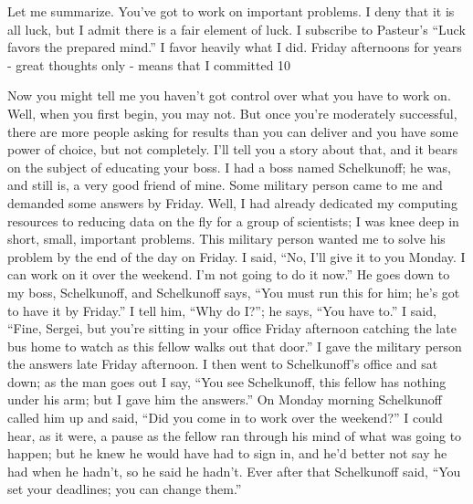 \documentclass{article}
\begin{document}
Let me summarize. You've got to work on important problems. I deny that it is all luck, but I admit there is a fair element of luck. I subscribe to Pasteur's ``Luck favors the prepared mind.'' I favor heavily what I did. Friday afternoons for years - great thoughts only - means that I committed 10%

Now you might tell me you haven't got control over what you have to work on. Well, when you first begin, you may not. But once you're moderately successful, there are more people asking for results than you can deliver and you have some power of choice, but not completely. I'll tell you a story about that, and it bears on the subject of educating your boss. I had a boss named Schelkunoff; he was, and still is, a very good friend of mine. Some military person came to me and demanded some answers by Friday. Well, I had already dedicated my computing resources to reducing data on the fly for a group of scientists; I was knee deep in short, small, important problems. This military person wanted me to solve his problem by the end of the day on Friday. I said, ``No, I'll give it to you Monday. I can work on it over the weekend. I'm not going to do it now.'' He goes down to my boss, Schelkunoff, and Schelkunoff says, ``You must run this for him; he's got to have it by Friday.'' I tell him, ``Why do I?''; he says, ``You have to.'' I said, ``Fine, Sergei, but you're sitting in your office Friday afternoon catching the late bus home to watch as this fellow walks out that door.'' I gave the military person the answers late Friday afternoon. I then went to Schelkunoff's office and sat down; as the man goes out I say, ``You see Schelkunoff, this fellow has nothing under his arm; but I gave him the answers.'' On Monday morning Schelkunoff called him up and said, ``Did you come in to work over the weekend?'' I could hear, as it were, a pause as the fellow ran through his mind of what was going to happen; but he knew he would have had to sign in, and he'd better not say he had when he hadn't, so he said he hadn't. Ever after that Schelkunoff said, ``You set your deadlines; you can change them.''
\end{document}
